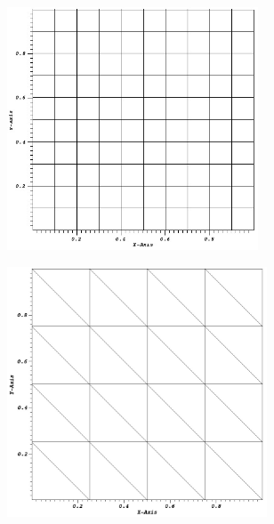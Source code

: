 \begin{figure}
\centering
	\begin{subfigure}[b]{0.5\textwidth}
		\centering
		\includegraphics[width=0.82\textwidth]{figures/sec_DSA/SIP_cart_mesh.png}
		\caption{}
	\end{subfigure}
	\vfill
	\begin{subfigure}[b]{0.45\textwidth}
		\centering
		\includegraphics[width=0.85\textwidth]{figures/sec_DSA/SIP_tri_mesh.png}
		\caption{}
	\end{subfigure}
	\hfill
	\begin{subfigure}[b]{0.45\textwidth}

\end{subfigure}
\end{figure}
